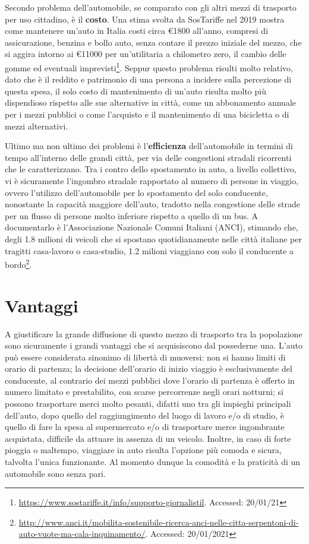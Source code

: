 Secondo problema dell'automobile, se comparato con gli altri mezzi di trasporto per uso cittadino, è il \textbf{costo}. Una stima svolta da SosTariffe nel 2019 mostra come mantenere un'auto in Italia costi circa €1800 all'anno, compresi di assicurazione, benzina e bollo auto, senza contare il prezzo iniziale del mezzo, che si aggira intorno ai €11000 per un'utilitaria a chilometro zero, il cambio delle gomme ed eventuali imprevisti\footnote{\url{https://www.sostariffe.it/info/supporto-giornalistil}. Accessed: 20/01/21}. Seppur questo problema risulti molto relativo, dato che è il reddito e patrimonio di una persona a incidere sulla percezione di questa spesa, il solo costo di mantenimento di un'auto risulta molto più dispendioso rispetto alle sue alternative in città, come un abbonamento annuale per i mezzi pubblici o come l'acquisto e il mantenimento di una bicicletta o di mezzi alternativi.

Ultimo ma non ultimo dei problemi è l'\textbf{efficienza} dell'automobile in termini di tempo all'interno delle grandi città, per via delle congestioni stradali ricorrenti che le caratterizzano. Tra i contro dello spostamento in auto, a livello collettivo, vi è sicuramente l'ingombro stradale rapportato al numero di persone in viaggio, ovvero l'utilizzo dell'automobile per lo spostamento del solo conducente, nonostante la capacità maggiore dell'auto, tradotto nella congestione delle strade per un flusso di persone molto inferiore rispetto a quello di un bus. A documentarlo è l'Associazione Nazionale Comuni Italiani (ANCI), stimando che, degli 1.8 milioni di veicoli che si spostano quotidianamente nelle città italiane per tragitti casa-lavoro o casa-studio, 1.2 milioni viaggiano con solo il conducente a bordo\footnote{\url{http://www.anci.it/mobilita-sostenibile-ricerca-anci-nelle-citta-serpentoni-di-auto-vuote-ma-cala-inquinamento/}. Accessed: 20/01/2021}.

\section{Vantaggi}

A giustificare la grande diffusione di questo mezzo di trasporto tra la popolazione sono sicuramente i grandi vantaggi che si acquisiscono dal possederne una. L'auto può essere considerata sinonimo di libertà di muoversi: non si hanno limiti di orario di partenza; la decisione dell'orario di inizio viaggio è esclusivamente del conducente, al contrario dei mezzi pubblici dove l'orario di partenza è offerto in numero limitato e prestabilito, con scarse percorrenze negli orari notturni; si possono trasportare merci molto pesanti, difatti uno tra gli impieghi principali dell'auto, dopo quello del raggiungimento del luogo di lavoro e/o di studio, è quello di fare la spesa al supermercato e/o di trasportare merce ingombrante acquistata, difficile da attuare in assenza di un veicolo. Inoltre, in caso di forte pioggia o maltempo, viaggiare in auto risulta l'opzione più comoda e sicura, talvolta l'unica funzionante. Al momento dunque la comodità e la praticità di un automobile sono senza pari.

